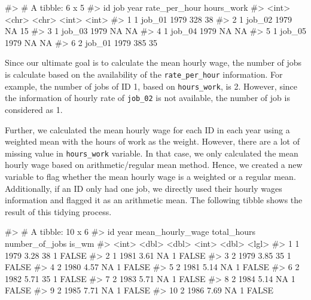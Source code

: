 \begin{Schunk}
\begin{Soutput}
#> # A tibble: 6 x 5
#>      id job    year  rate_per_hour hours_work
#>   <int> <chr>  <chr>         <int>      <int>
#> 1     1 job_01 1979            328         38
#> 2     1 job_02 1979             NA         15
#> 3     1 job_03 1979             NA         NA
#> 4     1 job_04 1979             NA         NA
#> 5     1 job_05 1979             NA         NA
#> 6     2 job_01 1979            385         35
\end{Soutput}
\end{Schunk}

Since our ultimate goal is to calculate the mean hourly wage, the number
of jobs is calculate based on the availability of the
\texttt{rate\_per\_hour} information. For example, the number of jobs of
ID 1, based on \texttt{hours\_work}, is 2. However, since the
information of hourly rate of \texttt{job\_02} is not available, the
number of job is considered as 1.

Further, we calculated the mean hourly wage for each ID in each year
using a weighted mean with the hours of work as the weight. However,
there are a lot of missing value in \texttt{hours\_work} variable. In
that case, we only calculated the mean hourly wage based on
arithmetic/regular mean method. Hence, we created a new variable to flag
whether the mean hourly wage is a weighted or a regular mean.
Additionally, if an ID only had one job, we directly used their hourly
wages information and flagged it as an arithmetic mean. The following
tibble shows the result of this tidying process.

\begin{Schunk}
\begin{Soutput}
#> # A tibble: 10 x 6
#>       id  year mean_hourly_wage total_hours number_of_jobs is_wm
#>    <int> <dbl>            <dbl>       <int>          <dbl> <lgl>
#>  1     1  1979             3.28          38              1 FALSE
#>  2     1  1981             3.61          NA              1 FALSE
#>  3     2  1979             3.85          35              1 FALSE
#>  4     2  1980             4.57          NA              1 FALSE
#>  5     2  1981             5.14          NA              1 FALSE
#>  6     2  1982             5.71          35              1 FALSE
#>  7     2  1983             5.71          NA              1 FALSE
#>  8     2  1984             5.14          NA              1 FALSE
#>  9     2  1985             7.71          NA              1 FALSE
#> 10     2  1986             7.69          NA              1 FALSE
\end{Soutput}
\end{Schunk}

